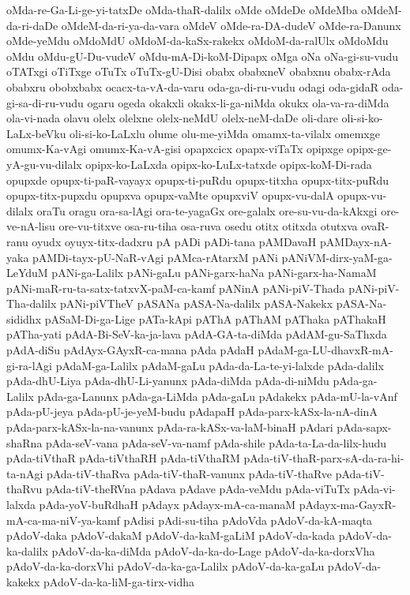 {oMda-re-Ga-Li-ge-yi-tatxDe
oMda-thaR-dalilx
oMde
oMdeDe
oMdeMba
oMdeM-da-ri-daDe
oMdeM-da-ri-ya-da-vara
oMdeV
oMde-ra-DA-dudeV
oMde-ra-Danunx
oMde-yeMdu
oMdoMdU
oMdoM-da-kaSx-rakekx
oMdoM-da-ralUlx
oMdoMdu
oMdu
oMdu-gU-Du-vudeV
oMdu-mA-Di-koM-Dipapx
oMga
oNa
oNa-gi-su-vudu
oTATxgi
oTiTxge
oTuTx
oTuTx-gU-Disi
obabx
obabxneV
obabxnu
obabx-rAda
obabxru
obobxbabx
ocacx-ta-vA-da-varu
oda-ga-di-ru-vudu
odagi
oda-gidaR
oda-gi-sa-di-ru-vudu
ogaru
ogeda
okakxli
okakx-li-ga-niMda
okukx
ola-va-ra-diMda
ola-vi-nada
olavu
olelx
olelxne
olelx-neMdU
olelx-neM-daDe
oli-dare
oli-si-ko-LaLx-beVku
oli-si-ko-LaLxlu
olume
olu-me-yiMda
omamx-ta-vilalx
omemxge
omumx-Ka-vAgi
omumx-Ka-vA-gisi
opapxcicx
opapx-viTaTx
opipxge
opipx-ge-yA-gu-vu-dilalx
opipx-ko-LaLxda
opipx-ko-LuLx-tatxde
opipx-koM-Di-rada
opupxde
opupx-ti-paR-vayayx
opupx-ti-puRdu
opupx-titxha
opupx-titx-puRdu
opupx-titx-pupxdu
opupxva
opupx-vaMte
opupxviV
opupx-vu-dalA
opupx-vu-dilalx
oraTu
oragu
ora-sa-lAgi
ora-te-yagaGx
ore-galalx
ore-su-vu-da-kAkxgi
ore-ve-nA-lisu
ore-vu-titxve
osa-ru-tiha
osa-ruva
osedu
otitx
otitxda
otutxva
ovaR-ranu
oyudx
oyuyx-titx-dadxru
pA
pADi
pADi-tana
pAMDavaH
pAMDayx-nA-yaka
pAMDi-tayx-pU-NaR-vAgi
pAMca-rAtarxM
pANi
pANiVM-dirx-yaM-ga-LeYduM
pANi-ga-Lalilx
pANi-gaLu
pANi-garx-haNa
pANi-garx-ha-NamaM
pANi-maR-ru-ta-satx-tatxvX-paM-ca-kamf
pANinA
pANi-piV-Thada
pANi-piV-Tha-dalilx
pANi-piVTheV
pASANa
pASA-Na-dalilx
pASA-Nakekx
pASA-Na-sididhx
pASaM-Di-ga-Lige
pATa-kApi
pAThA
pAThAM
pAThaka
pAThakaH
pATha-yati
pAdA-Bi-SeV-ka-ja-lava
pAdA-GA-ta-diMda
pAdAM-gu-SaThxda
pAdA-diSu
pAdAyx-GAyxR-ca-mana
pAda
pAdaH
pAdaM-ga-LU-dhavxR-mA-gi-ra-lAgi
pAdaM-ga-Lalilx
pAdaM-gaLu
pAda-da-La-te-yi-lalxde
pAda-dalilx
pAda-dhU-Liya
pAda-dhU-Li-yanunx
pAda-diMda
pAda-di-niMdu
pAda-ga-Lalilx
pAda-ga-Lanunx
pAda-ga-LiMda
pAda-gaLu
pAdakekx
pAda-mU-la-vAnf
pAda-pU-jeya
pAda-pU-je-yeM-budu
pAdapaH
pAda-parx-kASx-la-nA-dinA
pAda-parx-kASx-la-na-vanunx
pAda-ra-kASx-va-laM-binaH
pAdari
pAda-sapx-shaRna
pAda-seV-vana
pAda-seV-va-namf
pAda-shile
pAda-ta-La-da-lilx-hudu
pAda-tiVthaR
pAda-tiVthaRH
pAda-tiVthaRM
pAda-tiV-thaR-parx-sA-da-ra-hi-ta-nAgi
pAda-tiV-thaRva
pAda-tiV-thaR-vanunx
pAda-tiV-thaRve
pAda-tiV-thaRvu
pAda-tiV-theRVna
pAdava
pAdave
pAda-veMdu
pAda-viTuTx
pAda-vi-lalxda
pAda-yoV-buRdhaH
pAdayx
pAdayx-mA-ca-manaM
pAdayx-ma-GayxR-mA-ca-ma-niV-ya-kamf
pAdisi
pAdi-su-tiha
pAdoVda
pAdoV-da-kA-maqta
pAdoV-daka
pAdoV-dakaM
pAdoV-da-kaM-gaLiM
pAdoV-da-kada
pAdoV-da-ka-dalilx
pAdoV-da-ka-diMda
pAdoV-da-ka-do-Lage
pAdoV-da-ka-dorxVha
pAdoV-da-ka-dorxVhi
pAdoV-da-ka-ga-Lalilx
pAdoV-da-ka-gaLu
pAdoV-da-kakekx
pAdoV-da-ka-liM-ga-tirx-vidha
}
